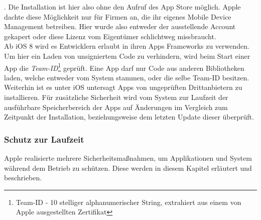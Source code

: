 		\cite{HeiseCheatApp2015}.
		Die Installation ist hier also ohne den Aufruf des
		App Store möglich. Apple dachte diese Möglichkeit nur für Firmen an, die ihr
		eigenes Mobile Device Management betreiben. Hier wurde also entweder der
		ausstellende Account gekapert oder diese Lizenz vom Eigentümer schlichtweg
		missbraucht.\\
		Ab iOS 8 wird es Entwicklern erlaubt in ihren Apps Frameworks zu verwenden. Um
		hier ein Laden von unsigniertem Code zu verhindern, wird beim Start einer App
		die \textsl{Team-ID}\footnote{Team-ID - 10 stelliger
		alphanumerischer String, extrahiert aus einem von Apple ausgestellten
		Zertifikat} geprüft. Eine App darf nur Code aus anderen Bibliotheken laden,
		welche entweder vom System stammen, oder die selbe Team-ID besitzen.
		Weiterhin ist es unter iOS untersagt Apps von ungeprüften Drittanbietern zu
		installieren. Für zusätzliche Sicherheit wird vom System zur
		Laufzeit der ausführbare Speicherbereich der Apps auf Änderungen im Vergleich
		zum Zeitpunkt der Installation, beziehungsweise dem letzten Update dieser
		überprüft.
		
	\subsubsection{Schutz zur Laufzeit}
		Apple realisierte mehrere Sicherheitsmaßnahmen, um Applikationen und System
		während dem Betrieb zu schützen. Diese werden in diesem Kapitel erläutert und
		beschrieben.
		
